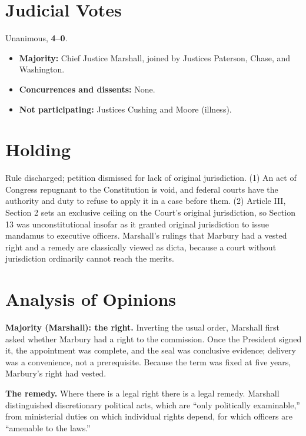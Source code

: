 \documentclass[12pt]{article}
\begin{document}
\section{Judicial Votes}

Unanimous, \textbf{4--0}.
\begin{itemize}
\item \textbf{Majority:} Chief Justice Marshall, joined by Justices Paterson, Chase, and Washington.
\item \textbf{Concurrences and dissents:} None.
\item \textbf{Not participating:} Justices Cushing and Moore (illness).
\end{itemize}

\section{Holding}

Rule discharged; petition dismissed for lack of original jurisdiction. (1) An act of Congress repugnant to the Constitution is void, and federal courts have the authority and duty to refuse to apply it in a case before them. (2) Article III, Section 2 sets an exclusive ceiling on the Court's original jurisdiction, so Section 13 was unconstitutional insofar as it granted original jurisdiction to issue mandamus to executive officers. Marshall's rulings that Marbury had a vested right and a remedy are classically viewed as dicta, because a court without jurisdiction ordinarily cannot reach the merits.

\section{Analysis of Opinions}

\textbf{Majority (Marshall): the right.} Inverting the usual order, Marshall first asked whether Marbury had a right to the commission. Once the President signed it, the appointment was complete, and the seal was conclusive evidence; delivery was a convenience, not a prerequisite. Because the term was fixed at five years, Marbury's right had vested.

\textbf{The remedy.} Where there is a legal right there is a legal remedy. Marshall distinguished discretionary political acts, which are ``only politically examinable,'' from ministerial duties on which individual rights depend, for which officers are ``amenable to the laws.''
\end{document}
